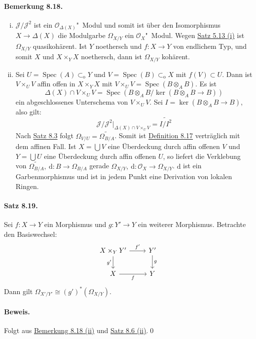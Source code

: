 \paragraph{Bemerkung 8.18.}\label{8.18}\begin{enumerate}[(i)]
\item $\mathcal{J}/\mathcal{J}^2$ ist ein $\mathcal{O}_{\Delta(X)}$"~Modul und somit ist über den Isomorphismus $X\to\Delta(X)$ die Modulgarbe $\Omega_{X/Y}$ ein $\mathcal{O}_X$"~Modul. Wegen \hyperref[5.13]{Satz 5.13 (i)} ist $\Omega_{X/Y}$ quasikohärent. Ist $Y$ noethersch und $f:X\to Y$ von endlichem Typ, und somit $X$ und $X\times_YX$ noethersch, dann ist $\Omega_{X/Y}$ kohärent.
\item Sei $U=\operatorname{Spec}(A)\subset_\text{o}Y$ und $V=\operatorname{Spec}(B)\subset_\text{o}X$ mit $f(V)\subset U$. Dann ist $V\times_UV$ affin offen in $X\times_YX$ mit $V\times_UV= \operatorname{Spec}(B\otimes_AB)$. Es ist
\[\Delta(X)\cap V\times_UV = \operatorname{Spec}(B\otimes_AB/\ker(B\otimes_AB\to B)) \]
ein abgeschlossenes Unterschema von $V\times_UV$. Sei $I=\ker(B\otimes_AB\to B)$, also gilt:
\[\mathcal{J}/\mathcal{J}^2|_{\Delta(X)\cap V\times_UV} = \widetilde{I/I^2} \]
Nach \hyperref[8.3]{Satz 8.3} folgt $\Omega_{V/U}=\widetilde{\Omega_{B/A}}$. Somit ist \hyperref[8.17]{Definition 8.17} verträglich mit dem affinen Fall. Ist $X=\bigcup V$ eine Überdeckung durch affin offenen $V$ und $Y=\bigcup U$ eine Überdeckung durch affin offenen $U$, so liefert die Verklebung von $\widetilde{\Omega_{B/A}},\ \mathrm{d}:B\to\Omega_{B/A}$ gerade $\Omega_{X/Y},\ \mathrm{d}:\mathcal{O}_X\to\Omega_{X/Y}$. $\mathrm{d}$ ist ein Garbenmorphismus und ist in jedem Punkt eine Derivation von lokalen Ringen.
\end{enumerate}

\paragraph{Satz 8.19.}\label{8.19} Sei $f:X\to Y$ ein Morphismus und $g:Y'\to Y$ ein weiterer Morphismus. Betrachte den Basiswechsel:
\[\begin{tikzcd}
X\times_YY' \rar["f'"]\dar["g'"'] & Y'\dar["g"]\\
X\rar["f"'] & Y
\end{tikzcd} \]
Dann gilt $\Omega_{X'/Y'}\cong (g')^\ast(\Omega_{X/Y})$.

\paragraph{Beweis.} Folgt aus \hyperref[8.18]{Bemerkung 8.18 (ii)} und \hyperref[8.6]{Satz 8.6 (ii)}.\qed

